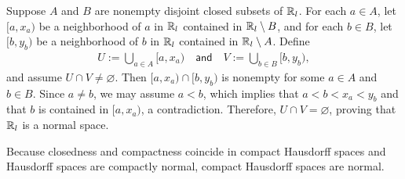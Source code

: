 \begin{exmp}[$\bb{R}_l$ is normal]
    Suppose $A$ and $B$ are nonempty disjoint closed subsets of $\bb{R}_l$.
    For each $a\in A$, let $[a, x_a)$ be a neighborhood of $a$ in $\bb{R}_l$ contained in ${\mathbb{R}}_l\setminus B$, and for each $b\in B$, let $[b, y_b)$ be a neighborhood of $b$ in $\bb{R}_l$ contained in ${\mathbb{R}}_l\setminus A$.
    Define
    \begin{align*}
        U:=\bigcup_{a\in A}[a, x_a)
        \quad\textsf{and}\quad
        V:=\bigcup_{b\in B}[b, y_b),
    \end{align*}
    and assume $U\cap V\neq\varnothing$.
    Then $[a, x_a)\cap[b, y_b)$ is nonempty for some $a\in A$ and $b\in B$.
    Since $a\neq b$, we may assume $a<b$, which implies that $a<b<x_a<y_b$ and that $b$ is contained in $[a, x_a)$, a contradiction.
    Therefore, $U\cap V=\varnothing$, proving that $\bb{R}_l$ is a normal space.
\end{exmp}

\begin{exmp}
    Because closedness and compactness coincide in compact Hausdorff spaces and Hausdorff spaces are compactly normal, compact Hausdorff spaces are normal.
\end{exmp}